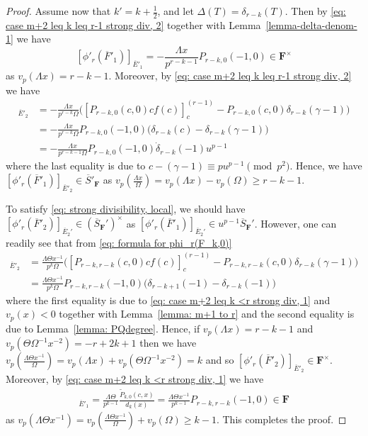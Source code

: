 \documentclass[11pt]{amsart}
\theoremstyle{definition}
\numberwithin{equation}{subsection}
\theoremstyle{plain}
\theoremstyle{plain}
\theoremstyle{plain}
\theoremstyle{plain}
\theoremstyle{plain}
\theoremstyle{plain}
\theoremstyle{plain}
\theoremstyle{plain}
\theoremstyle{plain}
\theoremstyle{plain}
\theoremstyle{plain}
\theoremstyle{plain}
\theoremstyle{definition}
\theoremstyle{definition}
\theoremstyle{definition}
\theoremstyle{remark}
\renewcommand{\(}{\textup{(}}
\renewcommand{\)}{\textup{)}}
\newcommand{\F}{\mathbf{F}}
\newcommand{\barS}{\overline{S}}
\newcommand{\barE}{\overline{E}}
\newcommand{\barF}{\overline{F}}
\begin{document}
\begin{proof}
Assume now that $k'=k+\frac{1}{2}$, and let $\Delta(T)=\delta_{r-k}(T)$. Then by \eqref{eq: case m+2 leq k leq r-1 strong div, 2} together with Lemma~\ref{lemma-delta-denom-1} we have $$[\phi'_r(\barF'_1)]_{\barE'_1}=-\frac{\Lambda x}{p^{r-k-1}}P_{r-k,0}(-1,0)\in\F^\times$$ as $v_p(\Lambda x)=r-k-1$. Moreover, by \eqref{eq: case m+2 leq k leq r-1 strong div, 2} we have
\begin{align*}
[\phi'_r(\barF'_1)]_{\barE'_2}&=-\frac{\Lambda x}{p^{r-k}\Omega} \big([P_{r-k,0}(c,0)cf(c)]_c^{(r-1)}-P_{r-k,0}(c,0)\delta_{r-k}(\gamma-1)\big)\\
&=-\frac{\Lambda x}{p^{r-k}\Omega} P_{r-k,0}(-1,0)\big(\delta_{r-k}(c)-\delta_{r-k}(\gamma-1)\big)\\
&=-\frac{\Lambda x}{p^{r-k-1}\Omega} P_{r-k,0}(-1,0)\dot{\delta}_{r-k}(-1)u^{p-1}
\end{align*}
where the last equality is due to $c-(\gamma-1)\equiv pu^{p-1}\pmod{p^2}$. Hence, we have $[\phi'_r(\barF'_1)]_{\barE'_2}\in\barS'_\F$ as $v_p(\frac{\Lambda x}{\Omega})=v_p(\Lambda x)-v_p(\Omega)\geq r-k-1$.

To satisfy \eqref{eq: strong divisibility, local}, we should have $[\phi'_r(\barF'_2)]_{\barE_2'}\in (\barS_\F')^\times$ as $[\phi'_r(\barF'_1)]_{\barE_2'}\in u^{p-1}\barS_\F'$. However, one can readily see that from \eqref{eq: formula for phi_r(F_k,0)}
\begin{align*}
[\phi'_r(\barF'_2)]_{\barE'_2}& =\frac{\Lambda\Theta x^{-1}}{p^{k}\Omega} \big([P_{r-k,r-k}(c,0)cf(c)]_c^{(r-1)}-P_{r-k,r-k}(c,0)\delta_{r-k}(\gamma-1)\big)\\
&=\frac{\Lambda\Theta x^{-1}}{p^{k}\Omega} P_{r-k,r-k}(-1,0)\big(\delta_{r-k+1}(-1)-\delta_{r-k}(-1)\big)
\end{align*}
where the first equality is due to \eqref{eq: case m+2 leq k <r strong div, 1} and $v_p(x)<0$ together with Lemma~\ref{lemma: m+1 to r} and the second equality is due to Lemma~\ref{lemma: PQdegree}. Hence, if $v_p(\Lambda x)=r-k-1$ and $v_p(\Theta\Omega^{-1}x^{-2})=-r+2k+1$ then we have $v_p(\frac{\Lambda\Theta x^{-1}}{\Omega})=v_p(\Lambda x)+v_p(\Theta\Omega^{-1}x^{-2})=k$ and so $[\phi'_r(\barF'_2)]_{\barE'_2}\in\F^{\times}$. Moreover, by \eqref{eq: case m+2 leq k <r strong div, 1} we have
\begin{align*}
[\phi'_r(\barF'_2)]_{\barE'_1}= \frac{ \Lambda \Theta}{p^{k-1}}\frac{\tilde{P}_{k,0}(c,x)}{d_{k}(x)} =\frac{ \Lambda \Theta x^{-1}}{p^{k-1}}P_{r-k,r-k}(-1,0)\in\F
\end{align*}
as $v_p(\Lambda\Theta x^{-1})=v_p(\frac{\Lambda\Theta x^{-1}}{\Omega})+v_p(\Omega)\geq k-1$. This completes the proof.
\end{proof}
\end{document}
